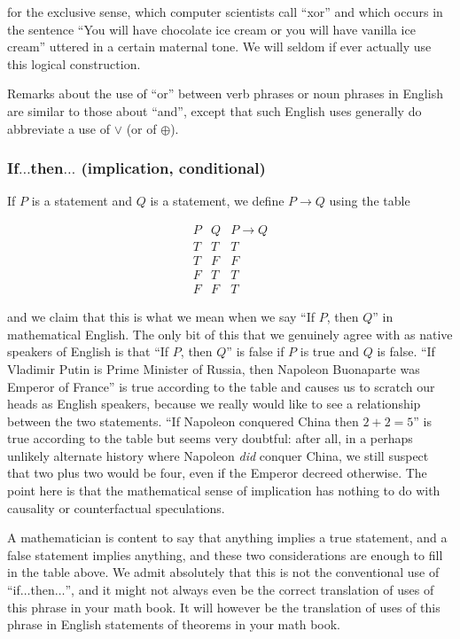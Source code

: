 \documentclass[12pt]{article}
\begin{document}
for the exclusive sense, which computer scientists call ``xor'' and
which occurs in the sentence ``You will have chocolate ice cream or
you will have vanilla ice cream'' uttered in a certain maternal tone.
We will seldom if ever actually use this logical construction.

Remarks about the use of ``or'' between verb phrases or noun phrases
in English are similar to those about ``and'', except that such
English uses generally do abbreviate a use of $\vee$ (or of $\oplus$).

\subsubsection{If$\ldots$then$\ldots$ (implication, conditional)}

If $P$ is a statement and $Q$ is a statement, we define $P \rightarrow Q$
using the table

$$\begin{array}{c|c|c} P  & Q & P \rightarrow Q \\ \hline
                       T  & T &   T  \\
                       T  & F &   F  \\
                       F  & T &   T  \\
                       F  & F &   T \end{array}$$

and we claim that this is what we mean when we say ``If $P$, then
$Q$'' in mathematical English.  The only bit of this that we genuinely
agree with as native speakers of English is that ``If $P$, then $Q$''
is false if $P$ is true and $Q$ is false.  ``If Vladimir Putin is
Prime Minister of Russia, then Napoleon Buonaparte was Emperor of
France'' is true according to the table and causes us to scratch our
heads as English speakers, because we really would like to see a
relationship between the two statements.  ``If Napoleon conquered
China then $2+2=5$'' is true according to the table but seems very
doubtful: after all, in a perhaps unlikely alternate history where
Napoleon {\em did} conquer China, we still suspect that two plus two
would be four, even if the Emperor decreed otherwise.  The point here
is that the mathematical sense of implication has nothing to do with
causality or counterfactual speculations.

A mathematician is content to say that anything implies a true
statement, and a false statement implies anything, and these two
considerations are enough to fill in the table above.  We admit
absolutely that this is not the conventional use of
``if$\ldots$then$\ldots$'', and it might not always even be the
correct translation of uses of this phrase in your math book.  It will
however be the translation of uses of this phrase in English
statements of theorems in your math book.
\end{document}
